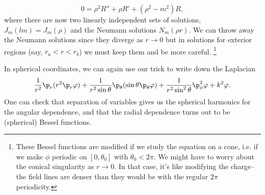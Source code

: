 \begin{equation}
    0=\rho^2 R'' + \rho R' + (\rho^2 - m^2) R,
\end{equation}
where there are now two linearly independent sets of solutions, $J_m(lm) = J_m(\rho)$ and the Neumann solutions $N_m(\rho r)$. We can throw away the Neumann solutions since they diverge as $r\to 0$ but in solutions for exterior regions (say, $r_a < r < r_b$) we must keep them and be more careful.%
    \footnote{These Bessel functions are modified if we study the equation on a cone, i.e. if we make $\phi$ periodic on $[0,\theta_0]$ with $\theta_0 < 2\pi$. We might have to worry about the conical singularity as $r\to 0$. In that case, it's like modifying the charge-- the field lines are denser than they would be with the regular $2\pi$ periodicity.}

In spherical coordinates, we can again use our trick to write down the Laplacian
\begin{equation}
    \frac{1}{r^2}\p_r (r^2 \p_r \varphi) + \frac{1}{r^2 \sin \theta} \p_\theta (\sin \theta \p_\theta \varphi) + \frac{1}{r^2 \sin^2 \theta} \p_\phi^2 \varphi + k^2 \varphi.
\end{equation}
One can check that separation of variables gives us the spherical harmonics for the angular dependence, and that the radial dependence turns out to be (spherical) Bessel functions.